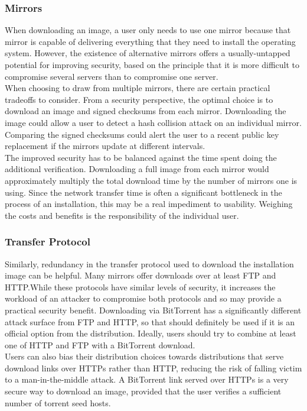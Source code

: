 \documentclass[conference]{IEEEtran}
\begin{document}
\subsubsection{Mirrors}

When downloading an image, a user only needs to use one mirror because that mirror is
capable of delivering everything that they need to install the operating system. However,
the existence of alternative mirrors offers a usually-untapped potential for improving
security, based on the principle that it is more difficult to compromise several servers
than to compromise one server.\\
\indent When choosing to draw from multiple mirrors, there are
certain practical tradeoffs to consider. From a security perspective, the optimal choice
is to download an image and signed checksums from each mirror. Downloading
the image could allow a user to detect a hash collision attack on an individual mirror.
Comparing the signed checksums could alert the user to a recent public key replacement if
the mirrors update at different intervals.\\
\indent The improved security has to be balanced against the time spent doing the additional
verification. Downloading a full image from each mirror would approximately multiply the
total download time by the number of mirrors one is using. Since the network transfer time
is often a significant bottleneck in the process of an installation, this may be a real
impediment to usability. Weighing the costs and benefits is the responsibility of the
individual user.

\subsubsection{Transfer Protocol}

Similarly, redundancy in the transfer protocol used to download the installation image
can be helpful. Many mirrors offer downloads over at least FTP and HTTP.\@ While these
protocols have similar levels of security, it increases the workload of an attacker to
compromise both protocols and so may provide a practical security benefit. Downloading
via BitTorrent has a significantly different attack surface from FTP and HTTP, so that
should definitely be used if it is an official option from the distribution. Ideally,
users should try to combine at least one of HTTP and FTP with a BitTorrent download.\\
\indent Users can
also bias their distribution choices towards distributions that serve download links
over HTTPs rather than HTTP, reducing the risk of falling victim to a man-in-the-middle
attack. A BitTorrent link served over HTTPs is a very secure way to download an image,
provided that the user verifies a sufficient number of torrent seed hosts.
\end{document}
